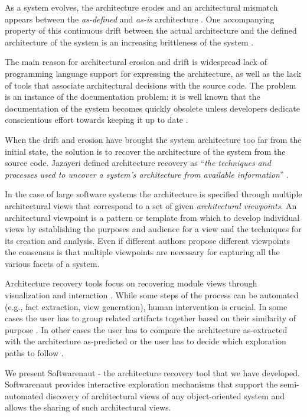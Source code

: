\documentclass[preprint,12pt]{elsarticle}
\begin{document}
As a system evolves, the architecture erodes \cite{perry-foundations} and an architectural mismatch appears between the {\em as-defined} and {\em as-is} architecture \cite{garlan-mismatch}. One accompanying property of this continuous drift between the actual architecture and the defined architecture of the system is an increasing brittleness of the system \cite{perry-foundations}. 

The main reason for architectural erosion and drift is widespread lack of programming language support for expressing the architecture, as well as the lack of tools that associate architectural decisions with the source code. The problem is an instance of the documentation problem: it is well known that the documentation of the system becomes quickly obsolete unless developers dedicate conscientious effort towards keeping it up to date \cite{riva-report}.

When the drift and erosion have brought the system architecture too far from the initial state, the solution is to recover the architecture of the system from the source code. Jazayeri defined architecture recovery as ``{\em the techniques and processes used to uncover a system's architecture from available information}'' \cite{jaza-archevo}. 

In the case of large software systems the architecture is specified through multiple architectural views that correspond to a set of given {\em architectural viewpoints}. An architectural viewpoint is a pattern or template from which to develop individual views by establishing the purposes and audience for a view and the techniques for its creation and analysis. Even if different authors propose different viewpoints \cite{bass-architecture, kruchten-4plus, hof-apparch} the consensus is that multiple viewpoints are necessary for capturing all the various facets of a system.

Architecture recovery tools focus on recovering module views through visualization and interaction \cite{murphy-reflexion, muller-rigi, storey-shrimp}. While some steps of the process can be automated (e.g., fact extraction, view generation), human intervention is crucial. In some cases the user has to group related artifacts together based on their similarity of purpose \cite{muller-rigi}. In other cases the user has to compare the architecture as-extracted with the architecture as-predicted \cite{murphy-reflexion} or the user has to decide which exploration paths to follow \cite{storey-shrimp}.

We present Softwarenaut \cite{lungu-relevo, lungu-packages} - the architecture recovery tool that we have developed. Softwarenaut provides interactive exploration mechanisms that support the semi-automated discovery of architectural views of any object-oriented system and allows the sharing of such architectural views. 
\end{document}
